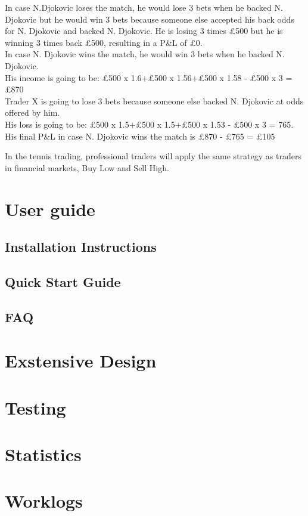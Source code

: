 \documentclass[10pt]{report}
\begin{document}
In case N.Djokovic loses the match, he would lose 3 bets when he backed N. Djokovic but he would win 3 bets because someone else accepted his back odds for N. Djokovic 
and backed N. Djokovic. 
He is losing 3 times \pounds500 but he is winning 3 times back \pounds500, resulting in a P\&L of \pounds0.\\

In case N. Djokovic wins the match, he would win 3 bets when he backed N. Djokovic. \\
His income is going to be: \pounds500 x 1.6+\pounds500 x 1.56+\pounds500 x 1.58 -  \pounds500 x 3 = \pounds870\\
Trader X is going to lose 3 bets because someone else backed N. Djokovic at odds offered by him. \\
His loss is going to be: \pounds500 x 1.5+\pounds500 x 1.5+\pounds500 x 1.53 - \pounds500 x 3  = 765. \\
His final  P\&L in case N. Djokovic wins the match is \pounds870 - \pounds765 = \pounds105

In the tennis trading, professional traders will apply the same strategy as traders in financial markets, Buy Low and Sell High. 

\chapter{User guide}

\section{Installation Instructions}

\section{Quick Start Guide}

\section{FAQ}

\chapter{Exstensive Design}

\chapter{Testing}

\chapter{Statistics}

\chapter{Worklogs}
\end{document}
